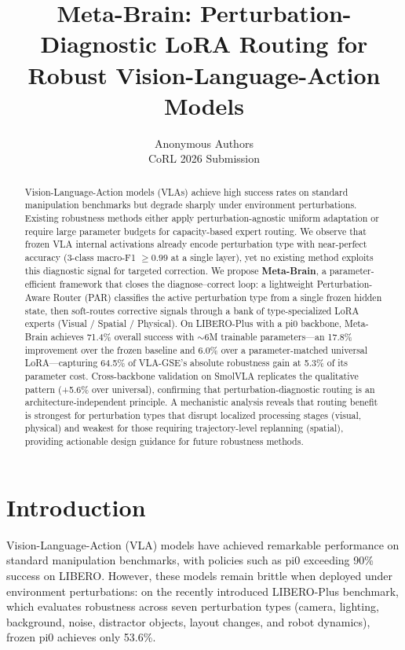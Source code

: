 \documentclass[letterpaper]{article}
\title{Meta-Brain: Perturbation-Diagnostic LoRA Routing for\\Robust Vision-Language-Action Models}
\author{
  Anonymous Authors\\
  CoRL 2026 Submission
}
\date{}
\begin{document}
\maketitle

\begin{abstract}
Vision-Language-Action models (VLAs) achieve high success rates on standard manipulation benchmarks but degrade sharply under environment perturbations.
Existing robustness methods either apply perturbation-agnostic uniform adaptation or require large parameter budgets for capacity-based expert routing.
We observe that frozen VLA internal activations already encode perturbation type with near-perfect accuracy (3-class macro-F1 $\geq 0.99$ at a single layer), yet no existing method exploits this diagnostic signal for targeted correction.
We propose \textbf{Meta-Brain}, a parameter-efficient framework that closes the diagnose--correct loop: a lightweight Perturbation-Aware Router (PAR) classifies the active perturbation type from a single frozen hidden state, then soft-routes corrective signals through a bank of type-specialized LoRA experts (Visual / Spatial / Physical).
On LIBERO-Plus with a pi0 backbone, Meta-Brain achieves 71.4\% overall success with ${\sim}6$M trainable parameters---an 17.8\% improvement over the frozen baseline and 6.0\% over a parameter-matched universal LoRA---capturing 64.5\% of VLA-GSE's absolute robustness gain at 5.3\% of its parameter cost.
Cross-backbone validation on SmolVLA replicates the qualitative pattern (+5.6\% over universal), confirming that perturbation-diagnostic routing is an architecture-independent principle.
A mechanistic analysis reveals that routing benefit is strongest for perturbation types that disrupt localized processing stages (visual, physical) and weakest for those requiring trajectory-level replanning (spatial), providing actionable design guidance for future robustness methods.
\end{abstract}

\section{Introduction}

Vision-Language-Action (VLA) models have achieved remarkable performance on standard manipulation benchmarks, with policies such as pi0 exceeding 90\% success on LIBERO.
However, these models remain brittle when deployed under environment perturbations: on the recently introduced LIBERO-Plus benchmark, which evaluates robustness across seven perturbation types (camera, lighting, background, noise, distractor objects, layout changes, and robot dynamics), frozen pi0 achieves only 53.6\%.
\end{document}
